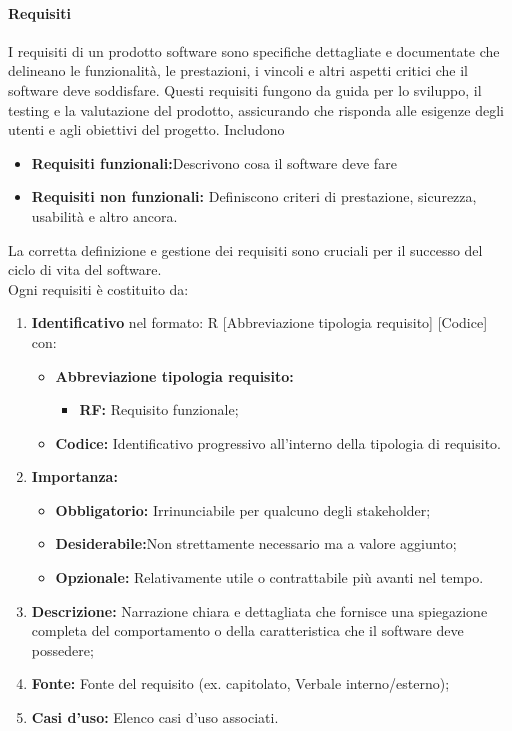 \documentclass{article}
\begin{document}
\paragraph{Requisiti}
I requisiti di un prodotto software sono specifiche dettagliate e documentate che delineano le funzionalità, le prestazioni, i vincoli e altri aspetti critici che il software deve soddisfare. Questi requisiti fungono da guida per lo sviluppo, il testing e la valutazione del prodotto, assicurando che risponda alle esigenze degli utenti e agli obiettivi del progetto.
Includono 
\begin{itemize}
    \item \textbf{Requisiti funzionali:}Descrivono cosa il software deve fare 
    \item \textbf{Requisiti non funzionali:} Definiscono criteri di prestazione, sicurezza, usabilità e altro ancora. 
\end{itemize}
La corretta definizione e gestione dei requisiti sono cruciali per il successo del ciclo di vita del software.\\
Ogni requisiti è costituito da:
\begin{enumerate}
    \item \textbf{Identificativo} nel formato: R [Abbreviazione tipologia requisito] [Codice]
    con:
    \begin{itemize}
        \item \textbf{Abbreviazione tipologia requisito:}
        \begin{itemize}
            \item \textbf{RF:} Requisito funzionale;
        \end{itemize} 
        \item \textbf{Codice:} Identificativo progressivo all'interno della tipologia di requisito.
    \end{itemize}
    \item \textbf{Importanza:}
    \begin{itemize}
        \item \textbf{Obbligatorio:} Irrinunciabile per qualcuno degli stakeholder;
        \item \textbf{Desiderabile:}Non strettamente necessario ma a valore aggiunto;
        \item \textbf{Opzionale:} Relativamente utile o contrattabile più avanti nel tempo.
    \end{itemize}
    \item \textbf{Descrizione:} Narrazione chiara e dettagliata che fornisce una spiegazione completa del comportamento o della caratteristica che il software deve possedere;
    \item \textbf{Fonte:} Fonte del requisito (ex. capitolato, Verbale interno/esterno);
    \item \textbf{Casi d'uso:} Elenco casi d'uso associati.
\end{enumerate}
\end{document}
